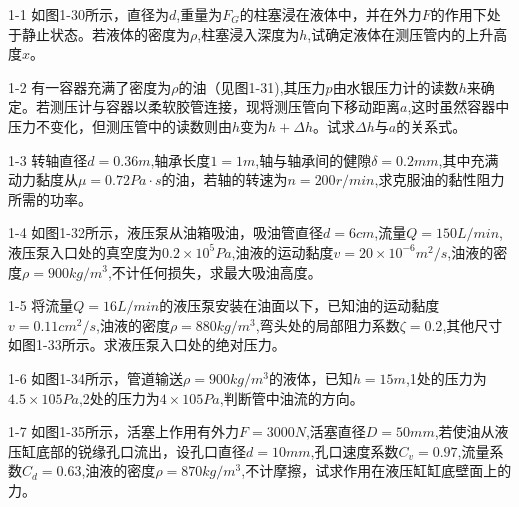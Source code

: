 1-1  如图1-30所示，直径为$d$,重量为$F_G$的柱塞浸在液体中，并在外力$F$的作用下处于静止状态。若液体的密度为$\rho $,柱塞浸入深度为$h$,试确定液体在测压管内的上升高度$x$。

1-2  有一容器充满了密度为$\rho $的油（见图1-31),其压力$p$由水银压力计的读数$h$来确定。若测压计与容器以柔软胶管连接，现将测压管向下移动距离$a$,这时虽然容器中压力不变化，但测压管中的读数则由$h$变为$h+\varDelta h$。试求$\varDelta h$与$a$的关系式。


1-3  转轴直径$d=0.36m$,轴承长度$1=1m$,轴与轴承间的健隙$\delta =0.2mm$,其中充满动力黏度从$\mu =0.72Pa·s$的油，若轴的转速为$n=200r/min$,求克服油的黏性阻力所需的功率。

1-4  如图1-32所示，液压泵从油箱吸油，吸油管直径$d=6cm$,流量$Q=150L/min$,液压泵入口处的真空度为$0.2 \times 10^5Pa$,油液的运动黏度$v=20\times10^{-6}m^2/s$,油液的密度$\rho =900kg/m^3$,不计任何损失，求最大吸油高度。

1-5  将流量$Q=16L/min$的液压泵安装在油面以下，已知油的运动黏度
$ v = 0.11 cm^2 / s $,油液的密度$\rho=880kg/m^3$,弯头处的局部阻力系数$\zeta =0.2$,其他尺寸如图1-33所示。求液压泵入口处的绝对压力。

1-6  如图1-34所示，管道输送$\rho=900kg/m^3$的液体，已知$h=15m$,1处的压力为$4.5×105Pa$,2处的压力为$4×105Pa$,判断管中油流的方向。

1-7  如图1-35所示，活塞上作用有外力$F=3000N$,活塞直径$D=50mm$,若使油从液压缸底部的锐缘孔口流出，设孔口直径$d=10mm$,孔口速度系数$C_v=0.97$,流量系数$C_d=0.63$,油液的密度$\rho =870kg/m^3$,不计摩擦，试求作用在液压缸缸底壁面上的力。


